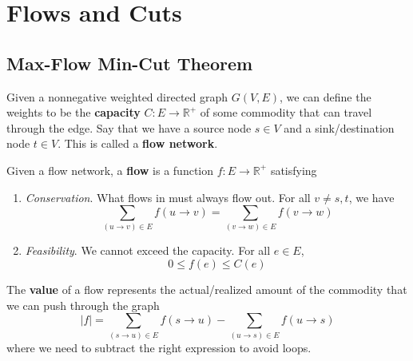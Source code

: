 \section{Flows and Cuts} 

\subsection{Max-Flow Min-Cut Theorem} 

  \begin{definition}
    Given a nonnegative weighted directed graph $G(V, E)$, we can define the weights to be the \textbf{capacity} $C: E \rightarrow \mathbb{R}^+$ of some commodity that can travel through the edge. Say that we have a source node $s \in V$ and a sink/destination node $t \in V$. This is called a \textbf{flow network}.
  \end{definition}

  \begin{definition}[Flow]
    Given a flow network, a \textbf{flow} is a function $f: E \rightarrow \mathbb{R}^+$ satisfying 
    \begin{enumerate}
      \item \textit{Conservation}. What flows in must always flow out. For all $v \neq s, t$, we have 
        \begin{equation}
          \sum_{(u \rightarrow v) \in E} f(u \rightarrow v) = \sum_{(v \rightarrow w) \in E} f(v \rightarrow w)
        \end{equation}

      \item \textit{Feasibility}. We cannot exceed the capacity. For all $e \in E$, 
        \begin{equation}
          0 \leq f(e) \leq C(e)
        \end{equation}
    \end{enumerate}
    The \textbf{value} of a flow represents the actual/realized amount of the commodity that we can push through the graph
    \begin{equation}
      |f| = \sum_{(s \rightarrow u) \in E}  f(s \rightarrow u) - \sum_{(u \rightarrow s) \in E}  f(u \rightarrow s) 
    \end{equation} 
    where we need to subtract the right expression to avoid loops. 
  \end{definition}

